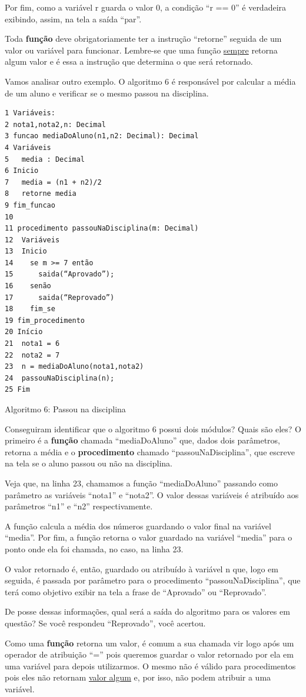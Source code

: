 \documentclass[11pt]{article}
\begin{document}
Por fim, como a variável r guarda o valor 0, a condição “r == 0” é verdadeira exibindo, assim, na tela a saída “par”.

Toda \textbf{função} deve obrigatoriamente ter a instrução “retorne” seguida de um valor ou variável para funcionar. Lembre-se que uma função \uline{sempre} retorna algum valor e é essa a instrução que determina o que será retornado.

Vamos analisar outro exemplo. O algoritmo 6 é responsável por calcular a média de um aluno e verificar se o mesmo passou na disciplina.

\begin{verbatim}
1 Variáveis:
2 nota1,nota2,n: Decimal
3 funcao mediaDoAluno(n1,n2: Decimal): Decimal
4 Variáveis
5   media : Decimal
6 Inicio
7   media = (n1 + n2)/2
8   retorne media
9 fim_funcao
10
11 procedimento passouNaDisciplina(m: Decimal)
12  Variáveis
13  Inicio
14    se m >= 7 então
15      saida(“Aprovado”);
16    senão
17      saida(“Reprovado”)
18    fim_se
19 fim_procedimento
20 Início
21  nota1 = 6
22  nota2 = 7
23  n = mediaDoAluno(nota1,nota2)
24  passouNaDisciplina(n);
25 Fim
\end{verbatim}
Algoritmo 6: Passou na disciplina

Conseguiram identificar que o algoritmo 6 possui dois módulos? Quais são eles? O primeiro é a \textbf{função} chamada “mediaDoAluno” que, dados dois parâmetros, retorna a média e o \textbf{procedimento} chamado “passouNaDisciplina”, que escreve na tela se o aluno passou ou não na disciplina.

Veja que, na linha 23, chamamos a função “mediaDoAluno” passando como parâmetro as variáveis “nota1” e “nota2”. O valor dessas variáveis é atribuído aos parâmetros “n1” e “n2” respectivamente.

A função calcula a média dos números guardando o valor final na variável “media”. Por fim, a função retorna o valor guardado na variável “media” para o ponto onde ela foi chamada, no caso, na linha 23.

O valor retornado é, então, guardado ou atribuído à variável n que, logo em seguida, é passada por parâmetro para o procedimento “passouNaDisciplina”, que terá como objetivo exibir na tela a frase de “Aprovado” ou “Reprovado”.

De posse dessas informações, qual será a saída do algoritmo para os valores em questão? Se você respondeu “Reprovado”, você acertou.

Como uma \textbf{função} retorna um valor, é comum a sua chamada vir logo após um operador de atribuição “=” pois queremos guardar o valor retornado por ela em uma variável para depois utilizarmos. O mesmo não é válido para procedimentos pois eles não retornam \uline{valor algum} e, por isso, não podem atribuir a uma variável.
\end{document}
